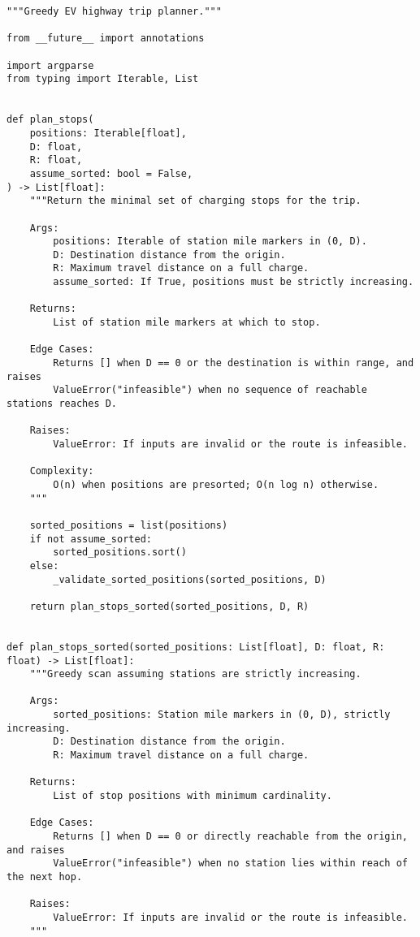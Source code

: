 \begin{lstlisting}[caption={Greedy EV planner implementation},label={lst:ev-greedy}]
"""Greedy EV highway trip planner."""

from __future__ import annotations

import argparse
from typing import Iterable, List


def plan_stops(
    positions: Iterable[float],
    D: float,
    R: float,
    assume_sorted: bool = False,
) -> List[float]:
    """Return the minimal set of charging stops for the trip.

    Args:
        positions: Iterable of station mile markers in (0, D).
        D: Destination distance from the origin.
        R: Maximum travel distance on a full charge.
        assume_sorted: If True, positions must be strictly increasing.

    Returns:
        List of station mile markers at which to stop.

    Edge Cases:
        Returns [] when D == 0 or the destination is within range, and raises
        ValueError("infeasible") when no sequence of reachable stations reaches D.

    Raises:
        ValueError: If inputs are invalid or the route is infeasible.

    Complexity:
        O(n) when positions are presorted; O(n log n) otherwise.
    """

    sorted_positions = list(positions)
    if not assume_sorted:
        sorted_positions.sort()
    else:
        _validate_sorted_positions(sorted_positions, D)

    return plan_stops_sorted(sorted_positions, D, R)


def plan_stops_sorted(sorted_positions: List[float], D: float, R: float) -> List[float]:
    """Greedy scan assuming stations are strictly increasing.

    Args:
        sorted_positions: Station mile markers in (0, D), strictly increasing.
        D: Destination distance from the origin.
        R: Maximum travel distance on a full charge.

    Returns:
        List of stop positions with minimum cardinality.

    Edge Cases:
        Returns [] when D == 0 or directly reachable from the origin, and raises
        ValueError("infeasible") when no station lies within reach of the next hop.

    Raises:
        ValueError: If inputs are invalid or the route is infeasible.
    """


\end{lstlisting}
